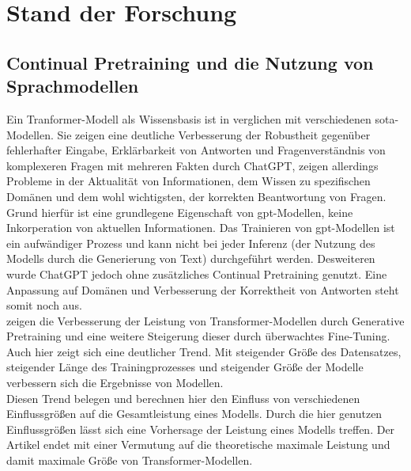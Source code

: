\chapter{Stand der Forschung}\label{ch:relatedWork}
\section{Continual Pretraining und die Nutzung von Sprachmodellen}

Ein Tranformer-Modell als Wissensbasis ist in \citet{chatgpt_qas} verglichen mit verschiedenen \ac{sota}-Modellen. 
Sie zeigen eine deutliche Verbesserung der Robustheit gegenüber fehlerhafter Eingabe, Erklärbarkeit von Antworten und Fragenverständnis von komplexeren Fragen mit mehreren Fakten durch ChatGPT, zeigen allerdings Probleme in der Aktualität von Informationen, dem Wissen zu spezifischen Domänen und dem wohl wichtigsten, der korrekten Beantwortung von Fragen. 
Grund hierfür ist eine grundlegene Eigenschaft von \ac{gpt}-Modellen, keine Inkorperation von aktuellen Informationen. 
Das Trainieren von \ac{gpt}-Modellen ist ein aufwändiger Prozess und kann nicht bei jeder Inferenz (der Nutzung des Modells durch die Generierung von Text) durchgeführt werden. 
Desweiteren wurde ChatGPT jedoch ohne zusätzliches Continual Pretraining genutzt.
Eine Anpassung auf Domänen und Verbesserung der Korrektheit von Antworten steht somit noch aus.\\

\citet{improve_language} zeigen die Verbesserung der Leistung von Transformer-Modellen durch Generative Pretraining und eine weitere Steigerung dieser durch überwachtes Fine-Tuning.
Auch hier zeigt sich eine deutlicher Trend. Mit steigender Größe des Datensatzes, steigender Länge des Trainingprozesses und steigender Größe der Modelle verbessern sich die Ergebnisse von Modellen.\\

Diesen Trend belegen \citet{scaling_laws} und berechnen hier den Einfluss von verschiedenen Einflussgrößen auf die Gesamtleistung eines Modells. Durch die hier genutzen Einflussgrößen lässt sich eine Vorhersage der Leistung eines Modells treffen. 
Der Artikel endet mit einer Vermutung auf die theoretische maximale Leistung und damit maximale Größe von Transformer-Modellen.\\

